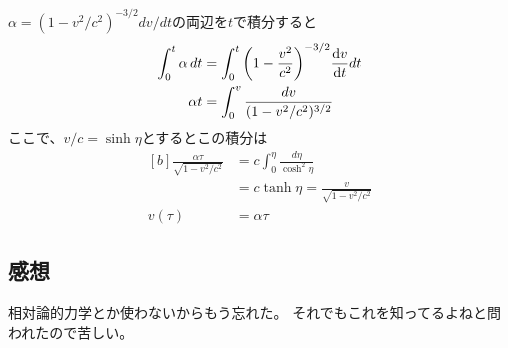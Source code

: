 \documentclass[../../sp_2015.tex]{subfiles}
\begin{document}
\subsection{}
\(\alpha=(1-v^2/c^2)^{-3/2}dv/dt\)の両辺を\(t\)で積分すると
\begin{equation}\begin{aligned}[b]
    \int_{0}^{t}\alpha \,dt &= \int_{0}^{t}\qty(1-\frac{v^2}{c^2})^{-3/2}\dv{v}{t}dt\\
    \alpha t&= \int_{0}^{v}\frac{dv}{(1-v^2/c^2)^{3/2}}
\end{aligned}\end{equation}
ここで、\(v/c=\sinh \eta\)とするとこの積分は
\begin{equation}\begin{aligned}[b]
    \frac{\alpha \tau}{\sqrt{1-v^2/c^2}} &= c\int_0^\eta \frac{d\eta}{\cosh^2 \eta}\\
    &= c\tanh\eta = \frac{v}{\sqrt{1-v^2/c^2}}\\
    v(\tau)&=\alpha\tau
\end{aligned}\end{equation}

\subsection*{感想}
相対論的力学とか使わないからもう忘れた。
それでもこれを知ってるよねと問われたので苦しい。
\end{document}
